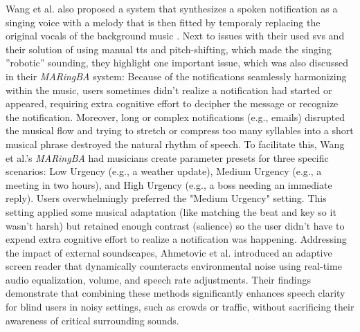 Wang et al. also proposed a system that synthesizes a spoken notification as a singing voice with a melody that is then fitted by temporaly replacing the original vocals of the background music \cite{Wang_24_MusicAwareAssist}. Next to issues with their used \gls{svs} and their solution of using manual \gls{tts} and pitch-shifting, which made the singing ''robotic'' sounding, they highlight one important issue, which was also discussed in their \textit{MARingBA} system: Because of the notifications seamlessly harmonizing within the music, users sometimes didn't realize a notification had started or appeared, requiring extra cognitive effort to decipher the message or recognize the notification. %
Moreover, long or complex notifications (e.g., emails) disrupted the musical flow and trying to stretch or compress too many syllables into a short musical phrase destroyed the natural rhythm of speech. %
To facilitate this, Wang et al.'s \textit{MARingBA} had musicians create parameter presets for three specific scenarios: Low Urgency (e.g., a weather update), Medium Urgency (e.g., a meeting in two hours), and High Urgency (e.g., a boss needing an immediate reply). Users overwhelmingly preferred the "Medium Urgency" setting. This setting applied some musical adaptation (like matching the beat and key so it wasn't harsh) but retained enough contrast (salience) so the user didn't have to  expend extra cognitive effort to realize a notification was happening. %
Addressing the impact of external soundscapes, Ahmetovic et al. \cite{Ahmetovic_23_AdaptiveScreenReader} introduced an adaptive screen reader that dynamically counteracts environmental noise using real-time audio equalization, volume, and speech rate adjustments. Their findings demonstrate that combining these methods significantly enhances speech clarity for blind users in noisy settings, such as crowds or traffic, without sacrificing their awareness of critical surrounding sounds. %
